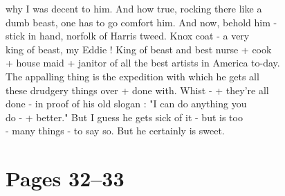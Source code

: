 \documentclass[11pt,a4paper]{article}
\begin{document}
{why I was decent to him. And how true, rocking there like a \\
dumb beast, one has to go comfort him. And now, behold him - \\
stick in hand, norfolk of Harris tweed. Knox coat - a very \\
king of beast, my Eddie ! King of beast and best nurse + cook \\
+ house maid + janitor of all the best artists in America to-day. \\
The appalling thing is the expedition with which he gets all \\
these drudgery things over + done with. Whist - + they're all \\
done - in proof of his old slogan : "I can do anything you \\
do - + better." But I guess he gets sick of it - but is too \\
- many things - to say so. But he certainly is sweet.}







\section{Pages 32--33}
\end{document}
